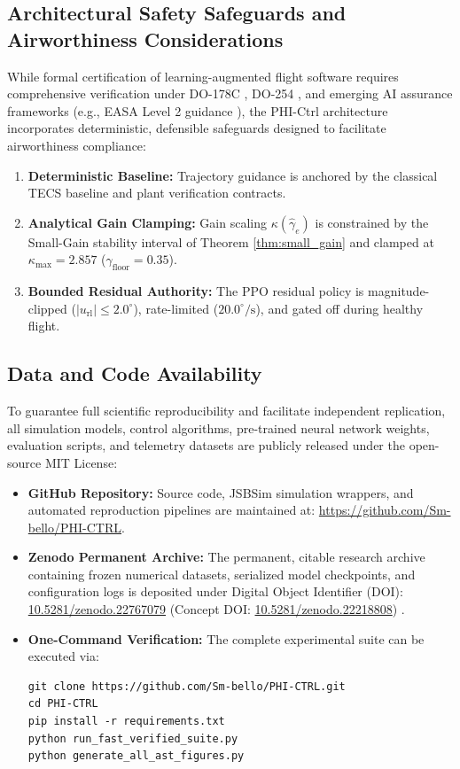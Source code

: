 \documentclass[review,12pt]{elsarticle}
\begin{document}
\subsection{Architectural Safety Safeguards and Airworthiness Considerations}
While formal certification of learning-augmented flight software requires comprehensive verification under DO-178C \cite{DO178C}, DO-254 \cite{DO254}, and emerging AI assurance frameworks (e.g., EASA Level 2 guidance \cite{EASA2021}), the PHI-Ctrl architecture incorporates deterministic, defensible safeguards designed to facilitate airworthiness compliance:
\begin{enumerate}
    \item \textbf{Deterministic Baseline:} Trajectory guidance is anchored by the classical TECS baseline and plant verification contracts.
    \item \textbf{Analytical Gain Clamping:} Gain scaling $\kappa(\hat{\gamma}_e)$ is constrained by the Small-Gain stability interval of Theorem \ref{thm:small_gain} and clamped at $\kappa_{\max} = 2.857$ ($\gamma_{\text{floor}} = 0.35$).
    \item \textbf{Bounded Residual Authority:} The PPO residual policy is magnitude-clipped ($|u_{\text{rl}}| \le 2.0^\circ$), rate-limited ($20.0^\circ\text{/s}$), and gated off during healthy flight.
\end{enumerate}

\subsection{Data and Code Availability}
\label{sec:reproducibility}
To guarantee full scientific reproducibility and facilitate independent replication, all simulation models, control algorithms, pre-trained neural network weights, evaluation scripts, and telemetry datasets are publicly released under the open-source MIT License:
\begin{itemize}
    \item \textbf{GitHub Repository:} Source code, JSBSim simulation wrappers, and automated reproduction pipelines are maintained at: \url{https://github.com/Sm-bello/PHI-CTRL}.
    \item \textbf{Zenodo Permanent Archive:} The permanent, citable research archive containing frozen numerical datasets, serialized model checkpoints, and configuration logs is deposited under Digital Object Identifier (DOI): \href{https://doi.org/10.5281/zenodo.22767079}{10.5281/zenodo.22767079} (Concept DOI: \href{https://doi.org/10.5281/zenodo.22218808}{10.5281/zenodo.22218808}) \cite{SaniPhiCtrlZenodo}.
    \item \textbf{One-Command Verification:} The complete experimental suite can be executed via:
\begin{verbatim}
git clone https://github.com/Sm-bello/PHI-CTRL.git
cd PHI-CTRL
pip install -r requirements.txt
python run_fast_verified_suite.py
python generate_all_ast_figures.py
\end{verbatim}
\end{itemize}
\end{document}
